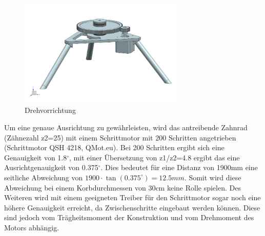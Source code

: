 \begin{figure}[h!]          
	\centering             
	\includegraphics[width=0.7\textwidth]{fig/Bild_Drehturm.png}    
	\caption{Drehvorrichtung}
	\label{fig:bild} 
\end{figure}

Um eine genaue Ausrichtung zu gewährleisten, wird das antreibende Zahnrad 
(Zähnezahl z2=25) mit einem Schrittmotor mit 200 Schritten angetrieben 
(Schrittmotor QSH 4218, 
QMot.eu). Bei 200 Schritten ergibt sich eine Genauigkeit von 1.8$^\circ$, mit einer 
Übersetzung von z1/z2=4.8 ergibt das eine Ausrichtgenauigkeit von 0.375$^\circ$. Dies 
bedeutet für eine Distanz von 1900mm eine seitliche Abweichung von 
$1900 \cdot \tan(0.375^\circ)= 12.5mm$. Somit wird diese Abweichung bei einem 
Korbdurchmessen von 30cm keine Rolle spielen. Des Weiteren wird mit einem 
geeigneten Treiber für den Schrittmotor sogar noch eine höhere Genauigkeit 
erreicht, da Zwischenschritte eingebaut werden können. Diese sind jedoch vom 
Trägheitsmoment der Konstruktion und vom Drehmoment des Motors abhängig. 

